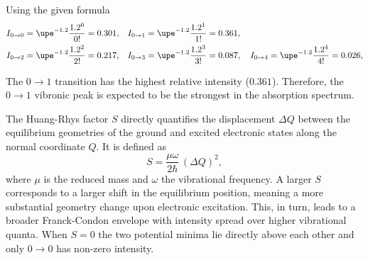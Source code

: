 \begin{solution}\leavevmode
  \begin{enumext}
    \item Using the given formula
    \[\begin{alignedat}{2}
      I_{0\to0} & = \upe^{-1.2} \frac{1.2^0}{0!} = 0.301,\quad &
      I_{0\to1} & = \upe^{-1.2} \frac{1.2^1}{1!} = 0.361,\\
      I_{0\to2} & = \upe^{-1.2} \frac{1.2^2}{2!} = 0.217,\quad &
      I_{0\to3} & = \upe^{-1.2} \frac{1.2^3}{3!} = 0.087,\quad
      I_{0\to4}   = \upe^{-1.2} \frac{1.2^4}{4!} = 0.026,
    \end{alignedat}\]
    \item The $0 \to 1$ transition has the highest relative intensity
    ($0.361$). Therefore, the $0 \to 1$ vibronic peak is expected to be the
    strongest in the absorption spectrum.
    \item The Huang-Rhys factor $S$ directly quantifies the displacement
    $\Delta Q$ between the equilibrium geometries of the ground and excited
    electronic states along the normal coordinate $Q$. It is defined as
    \[
      S = \frac{\mu\omega}{2\hbar}\,(\Delta Q)^2,
    \]
    where $\mu$ is the reduced mass and $\omega$ the vibrational frequency.
    A larger $S$ corresponds to a larger shift in the equilibrium position,
    meaning a more substantial geometry change upon electronic excitation.
    This, in turn, leads to a broader Franck-Condon envelope with intensity
    spread over higher vibrational quanta. When $S=0$ the two potential minima
    lie directly above each other and only $0\to 0$ has non-zero intensity.
  \end{enumext}
\end{solution}

